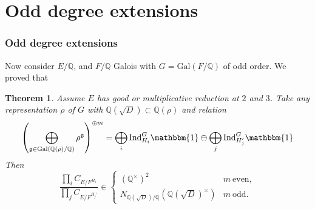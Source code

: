 \documentclass{beamer}
\newcommand{\Gal}{\mathrm{Gal}}
\newcommand{\rk}{\mathrm{rk}}
\newcommand{\Ind}{\mathrm{Ind}}
\newcommand{\QQ}{\mathbb{Q}}
\newcommand{\pp}{\mathfrak{p}}
\newcommand{\bQ}{\mathbb{Q}}
\theoremstyle{plain}
\newtheorem{thm}{Theorem}[section]
\begin{document}

\section*{Odd degree extensions}
\frame{\sectionpage}

\begin{frame}
    \frametitle{Odd degree extensions}
    Now consider $E / \bQ$, and $F / \bQ$ Galois with $G = \Gal(F / \bQ)$ of odd order. \pause
    We proved that
    {\begin{thm}\label{odd-exts}
       Assume $E$ has good or multiplicative reduction at $2$ and $3$. 
       Take any representation $\rho$ of $G$ with $\bQ(\sqrt{D}) \subset \bQ(\rho)$ and relation
       \begin{equation*}\label{odd-exp}
        \left(\bigoplus_{\mathfrak{g}\in\Gal(\QQ(\rho)/\QQ)}\rho^{\mathfrak{g}}\right)^{\oplus m }=\bigoplus_i\Ind_{H_i}^G\mathbbm{1}\ominus\bigoplus_j\Ind_{H_j'}^G\mathbbm{1}
       \end{equation*}
         Then
        \[ \frac{\prod_i C_{E/F^{H_i}}}{\prod_j C_{E/F^{H_j'}}}  \in 
           \begin{cases} 
            (\bQ^{\times})^2 & m \ \text{even},\\
               N_{\bQ(\sqrt{D}) / \bQ}(\bQ(\sqrt{D})^{\times}) & m \ \text{odd}.
           \end{cases} \] 
       \end{thm}}
\end{frame}
\end{document}
